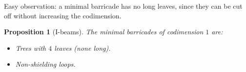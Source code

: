 \documentclass{amsart}
\newtheorem{prop}[proposition]{Proposition}
\theoremstyle{definition}
\newtheorem{definition}[proposition]{Definition}
\theoremstyle{remark}
\numberwithin{equation}{section}
\newcommand{\newword}[1]{\textbf{\emph{#1}}}
\newcommand{\0}{{\mathbf{0}}}
\newcommand{\M}{\mathcal{M}}
\renewcommand{\S}{\mathbf{S}}
\begin{document}
Easy observation: a minimal barricade has no long leaves, since they can be cut off without increasing the codimension.


\begin{prop}[I-beams]
The minimal barricades of codimension $1$ are:
\begin{itemize}
	\item Trees with $4$ leaves (none long).
	\item Non-shielding loops.
\end{itemize}
\end{prop}

\end{document}
